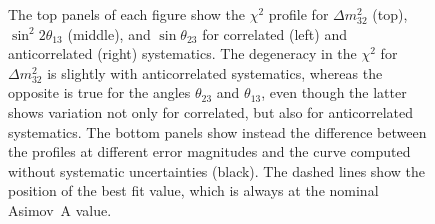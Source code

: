 \begin{figure}
	\centering
	\resizebox{0.49\linewidth}{!}{}
	\resizebox{0.49\linewidth}{!}{}
	\resizebox{0.49\linewidth}{!}{}
	\resizebox{0.49\linewidth}{!}{}
	\resizebox{0.49\linewidth}{!}{}
	\resizebox{0.49\linewidth}{!}{}
	\caption[$\chi^2$ profiles for $\Delta m_{32}^2$, $\sin^2 2\theta_{13}$, and $\sin\theta_{23}$ with a simplified systematic model]%
		{The top panels of each figure show the $\chi^2$ profile for %
		$\Delta m_{32}^2$ (top), $\sin^2 2\theta_{13}$ (middle), and $\sin\theta_{23}$ 
		for correlated (left) and anticorrelated (right) systematics. 
		The degeneracy in the $\chi^2$ for $\Delta m_{32}^2$ is slightly with anticorrelated systematics, %
		whereas the opposite is true for the angles $\theta_{23}$ and $\theta_{13}$, %
		even though the latter shows variation not only for correlated, but also for anticorrelated systematics.
		The bottom panels show instead the difference between the profiles at different error magnitudes and %
		the curve computed without systematic uncertainties (black).
		The dashed lines show the position of the best fit value, which is always at the nominal Asimov~A value.}
	\label{fig:nuenorm_mass_angles}
\end{figure}

